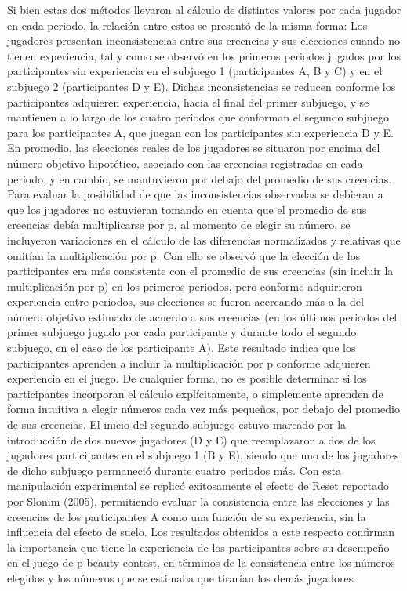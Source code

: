 Si bien estas dos métodos llevaron al cálculo de distintos valores por cada jugador en cada periodo,  la relación entre estos se presentó de la misma forma: Los jugadores presentan inconsistencias entre sus creencias y sus elecciones cuando no tienen experiencia, tal y como se observó en los primeros periodos jugados por los participantes sin experiencia en el subjuego 1 (participantes A, B y C)  y en  el subjuego 2 (participantes D y E). Dichas inconsistencias se reducen conforme los participantes adquieren experiencia, hacia el final del primer subjuego, y se mantienen a lo largo de los cuatro periodos que conforman el segundo subjuego para los participantes A, que juegan con los participantes sin experiencia D y E.
En promedio, las elecciones reales de los jugadores se situaron por encima del número objetivo hipotético, asociado con las  creencias registradas en cada periodo,  y en cambio, se mantuvieron por debajo del promedio de sus creencias.
Para evaluar la posibilidad de que las inconsistencias observadas se debieran a que los jugadores no estuvieran tomando en cuenta que el promedio de sus creencias debía multiplicarse por p, al momento de elegir su número, se incluyeron variaciones en el cálculo de las diferencias normalizadas y relativas que omitían la multiplicación por p. Con ello se observó que la elección de los participantes era más consistente con el promedio de sus creencias (sin incluir la multiplicación por p) en los primeros periodos, pero conforme adquirieron experiencia entre periodos, sus elecciones se fueron acercando más a la del número objetivo estimado de acuerdo a sus creencias (en los últimos periodos del primer subjuego jugado por cada participante y durante todo el segundo subjuego, en el caso de los participante A). Este resultado indica que los participantes aprenden a incluir la multiplicación por p conforme adquieren experiencia en el juego. De cualquier forma, no es posible determinar si los participantes incorporan el cálculo explícitamente, o simplemente aprenden de forma intuitiva a elegir números cada vez más pequeños, por debajo del promedio de sus creencias.
El inicio del segundo subjuego estuvo marcado por la introducción de dos nuevos jugadores (D y E) que reemplazaron a dos de los jugadores participantes en el subjuego 1 (B y E), siendo que uno de los jugadores de dicho subjuego permaneció durante cuatro periodos más. Con esta manipulación experimental se replicó exitosamente el efecto de Reset reportado por Slonim (2005), permitiendo evaluar la consistencia entre las elecciones y las creencias de los participantes A como una función de su experiencia, sin la influencia del efecto de suelo. Los resultados obtenidos a este respecto confirman la importancia que tiene la experiencia de los participantes sobre su desempeño en el juego de p-beauty contest, en términos de la consistencia entre los números elegidos y los números que se estimaba que tirarían los demás jugadores.
